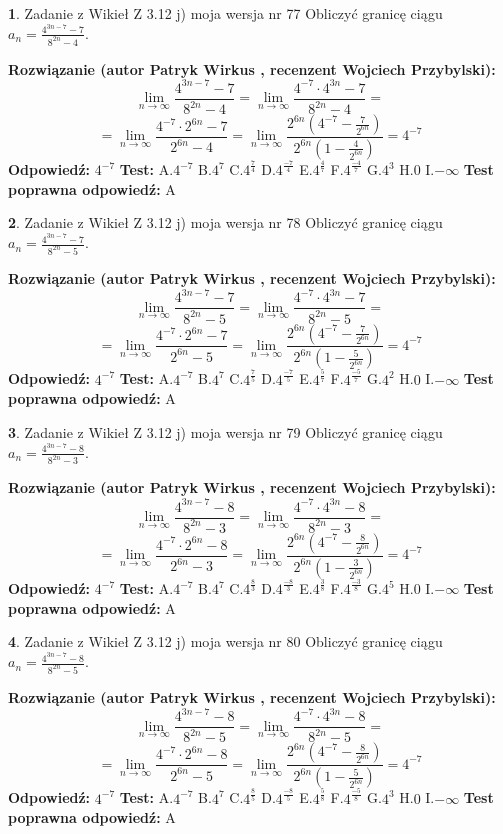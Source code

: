 \documentclass[12pt, a4paper]{article}
\theoremstyle{definition} %
\newtheorem{zad}{}
\newcommand{\zadStart}[1]{\begin{zad}#1\newline}
\newcommand{\zadStop}{\end{zad}}
\newcommand{\rozwStart}[2]{\noindent \textbf{Rozwiązanie (autor #1 , recenzent #2): }\newline}
\newcommand{\rozwStop}{\newline}
\newcommand{\odpStart}{\noindent \textbf{Odpowiedź:}\newline}
\newcommand{\odpStop}{\newline}
\newcommand{\testStart}{\noindent \textbf{Test:}\newline}
\newcommand{\testStop}{\newline}
\newcommand{\kluczStart}{\noindent \textbf{Test poprawna odpowiedź:}\newline}
\newcommand{\kluczStop}{\newline}
\begin{document}
\zadStart{Zadanie z Wikieł Z 3.12 j) moja wersja nr 77}
Obliczyć granicę ciągu $a_{n}=\frac{4^{3n-7}-7}{8^{2n}-4}$.
\zadStop
\rozwStart{Patryk Wirkus}{Wojciech Przybylski}
$$\lim\limits_{n\to\infty}\frac{4^{3n-7}-7}{8^{2n}-4}= \lim\limits_{n\to\infty}\frac{4^{-7} \cdot 4^{3n}-7}{8^{2n}-4}=$$
$$= \lim\limits_{n\to\infty}\frac{4^{-7} \cdot 2^{6n}-7}{2^{6n}-4}= \lim\limits_{n\to\infty}\frac{2^{6n}(4^{-7} - \frac{7}{2^{6n}})}{2^{6n}(1-\frac{4}{2^{6n}})}= 4^{-7}$$
\rozwStop
\odpStart
$4^{-7}$
\odpStop
\testStart
A.$4^{-7}$
B.$4^{7}$
C.$4^{\frac{7}{4}}$
D.$4^{\frac{-7}{4}}$
E.$4^{\frac{4}{7}}$
F.$4^{\frac{-4}{7}}$
G.$4^{3}$
H.$0$
I.$-\infty$
\testStop
\kluczStart
A
\kluczStop



\zadStart{Zadanie z Wikieł Z 3.12 j) moja wersja nr 78}
Obliczyć granicę ciągu $a_{n}=\frac{4^{3n-7}-7}{8^{2n}-5}$.
\zadStop
\rozwStart{Patryk Wirkus}{Wojciech Przybylski}
$$\lim\limits_{n\to\infty}\frac{4^{3n-7}-7}{8^{2n}-5}= \lim\limits_{n\to\infty}\frac{4^{-7} \cdot 4^{3n}-7}{8^{2n}-5}=$$
$$= \lim\limits_{n\to\infty}\frac{4^{-7} \cdot 2^{6n}-7}{2^{6n}-5}= \lim\limits_{n\to\infty}\frac{2^{6n}(4^{-7} - \frac{7}{2^{6n}})}{2^{6n}(1-\frac{5}{2^{6n}})}= 4^{-7}$$
\rozwStop
\odpStart
$4^{-7}$
\odpStop
\testStart
A.$4^{-7}$
B.$4^{7}$
C.$4^{\frac{7}{5}}$
D.$4^{\frac{-7}{5}}$
E.$4^{\frac{5}{7}}$
F.$4^{\frac{-5}{7}}$
G.$4^{2}$
H.$0$
I.$-\infty$
\testStop
\kluczStart
A
\kluczStop



\zadStart{Zadanie z Wikieł Z 3.12 j) moja wersja nr 79}
Obliczyć granicę ciągu $a_{n}=\frac{4^{3n-7}-8}{8^{2n}-3}$.
\zadStop
\rozwStart{Patryk Wirkus}{Wojciech Przybylski}
$$\lim\limits_{n\to\infty}\frac{4^{3n-7}-8}{8^{2n}-3}= \lim\limits_{n\to\infty}\frac{4^{-7} \cdot 4^{3n}-8}{8^{2n}-3}=$$
$$= \lim\limits_{n\to\infty}\frac{4^{-7} \cdot 2^{6n}-8}{2^{6n}-3}= \lim\limits_{n\to\infty}\frac{2^{6n}(4^{-7} - \frac{8}{2^{6n}})}{2^{6n}(1-\frac{3}{2^{6n}})}= 4^{-7}$$
\rozwStop
\odpStart
$4^{-7}$
\odpStop
\testStart
A.$4^{-7}$
B.$4^{7}$
C.$4^{\frac{8}{3}}$
D.$4^{\frac{-8}{3}}$
E.$4^{\frac{3}{8}}$
F.$4^{\frac{-3}{8}}$
G.$4^{5}$
H.$0$
I.$-\infty$
\testStop
\kluczStart
A
\kluczStop



\zadStart{Zadanie z Wikieł Z 3.12 j) moja wersja nr 80}
Obliczyć granicę ciągu $a_{n}=\frac{4^{3n-7}-8}{8^{2n}-5}$.
\zadStop
\rozwStart{Patryk Wirkus}{Wojciech Przybylski}
$$\lim\limits_{n\to\infty}\frac{4^{3n-7}-8}{8^{2n}-5}= \lim\limits_{n\to\infty}\frac{4^{-7} \cdot 4^{3n}-8}{8^{2n}-5}=$$
$$= \lim\limits_{n\to\infty}\frac{4^{-7} \cdot 2^{6n}-8}{2^{6n}-5}= \lim\limits_{n\to\infty}\frac{2^{6n}(4^{-7} - \frac{8}{2^{6n}})}{2^{6n}(1-\frac{5}{2^{6n}})}= 4^{-7}$$
\rozwStop
\odpStart
$4^{-7}$
\odpStop
\testStart
A.$4^{-7}$
B.$4^{7}$
C.$4^{\frac{8}{5}}$
D.$4^{\frac{-8}{5}}$
E.$4^{\frac{5}{8}}$
F.$4^{\frac{-5}{8}}$
G.$4^{3}$
H.$0$
I.$-\infty$
\testStop
\kluczStart
A
\kluczStop
\end{document}
